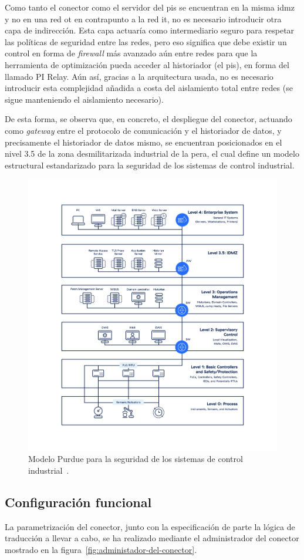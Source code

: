 Como tanto el conector como el servidor del \gls{pis} se encuentran en la misma \gls{idmz} y no en una red \gls{ot} en contrapunto a la red \gls{it}, no es necesario introducir otra capa de indirección. Esta capa actuaría como intermediario seguro para respetar las políticas de seguridad entre las redes, pero eso significa que debe existir un control en forma de \textit{firewall} más avanzado aún entre redes para que la herramienta de optimización pueda acceder al historiador (el \gls{pis}), en forma del llamado PI Relay. Aún así, gracias a la arquitectura usada, no es necesario introducir esta complejidad añadida a costa del aislamiento total entre redes (se sigue manteniendo el aislamiento necesario).

De esta forma, se observa que, en concreto, el despliegue del conector, actuando como \textit{gateway} entre el protocolo de comunicación y el historiador de datos, y precisamente el historiador de datos mismo, se encuentran posicionados en el nivel 3.5 de la zona desmilitarizada industrial de la \gls{pera}, el cual define un modelo estructural estandarizado para la seguridad de los sistemas de control industrial.

\begin{figure}
  \centering
  \includegraphics[width=0.5\linewidth]{figures/modelo-purdue.png}
  \caption[Modelo Purdue.]{Modelo Purdue para la seguridad de los sistemas de control industrial~\cite{zscaler2025what}.}%
  \label{fig:modelo-purdue}
\end{figure}

\subsection{Configuración funcional}%
\label{makereference3.4.3}

La parametrización del conector, junto con la especificación de parte la lógica de traducción a llevar a cabo, se ha realizado mediante el administrador del conector mostrado en la figura~\ref{fig:administador-del-conector}.

